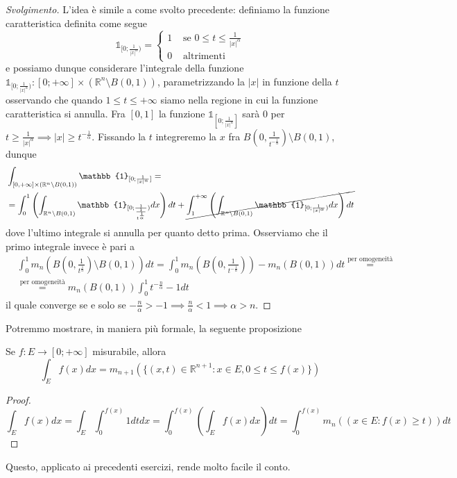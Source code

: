 \begin{proof}[Svolgimento]
	L'idea è simile a come svolto precedente: definiamo la funzione caratteristica definita come segue
	$$
	\mathbb{1}_{[0; \frac{1}{|x|^\alpha})} = \begin{cases} 1 & \text{ se } 0 \leq t \leq \frac{1}{|x|^\alpha} \\
		0 & \text{ altrimenti }
	\end{cases}
	$$
	e possiamo dunque considerare l'integrale della funzione $\mathbb{1}_{[0; \frac{1}{|x|^\alpha})} : [0; +\infty] \times (\mathbb{R}^n \setminus B(0,1))$, parametrizzando la $|x|$ in funzione della $t$ osservando che quando $1 \leq t \leq +\infty$ siamo nella regione in cui la funzione caratteristica si annulla. Fra $[0, 1]$ la funzione $\mathbb{1}_{[0; \frac{1}{|x|^\alpha}]}$ sarà $0$ per $t \geq \frac{1}{|x|^\alpha} \implies |x| \geq t^{-\frac{1}{\alpha}}$. Fissando la $t$ integreremo la $x$ fra $B(0, \frac{1}{t^{-\frac{1}{\alpha}}}) \setminus B(0,1)$, dunque
	\begin{align*}
	&\int_{[0, +\infty] \times (\mathbb{R}^n \setminus B(0,1))} \mathbb{1}_{[0; \frac{1}{|x|^\alpha}]} = \\
	&=\int_0^{1} \left(\int_{\mathbb{R}^n \setminus B(0,1)} \mathbb{1}_{[0; \frac{1}{\frac{1}{t^{\frac{1}{\alpha}}}})} dx \right) dt + \cancel{\int_1^{+\infty} \left( \int_{\mathbb{R}^n \setminus B(0, 1)} \mathbb{1}_{[0; \frac{1}{|x|^\alpha})} dx \right) dt}
	\end{align*}
	dove l'ultimo integrale si annulla per quanto detto prima. Osserviamo che il primo integrale invece è pari a
	\begin{align*}
	&\int_0^1 m_n \left(B \left(0, \frac{1}{t^{\frac{1}{\alpha}}} \right) \setminus B(0,1) \right)dt = \int_0^1 m_n \left( B \left(0, \frac{1}{t^{-\frac{1}{\alpha}}}\right) \right) - m_n(B(0, 1))dt \stackrel{\text{per omogeneità}}{=} \\
	&\stackrel{\text{per omogeneità}}{=} m_n(B(0,1))\int_0^1 t^{-\frac{n}{\alpha}} - 1 dt
	\end{align*}
	il quale converge se e solo se $-\frac{n}{\alpha} > - 1 \implies \frac{n}{\alpha} < 1 \implies \alpha > n$.
\end{proof}
Potremmo mostrare, in maniera più formale, la seguente proposizione
\begin{prop}
	Se $f: E \to [0; +\infty]$ misurabile, allora
$$
\int_E f(x)dx = m_{n+1}(\{(x,t) \in \mathbb{R}^{n+1}: x \in E, 0 \leq t \leq f(x) \})
$$
\end{prop}
\begin{proof}
$$
\int_E f(x)dx = \int_E \int_0^{f(x)} 1 dtdx = \int_0^{f(x)} \left( \int_E f(x) dx \right) dt = \int_0^{f(x)} m_n({(x \in E: f(x) \geq t)})dt
$$
\end{proof}
Questo, applicato ai precedenti esercizi, rende molto facile il conto.
